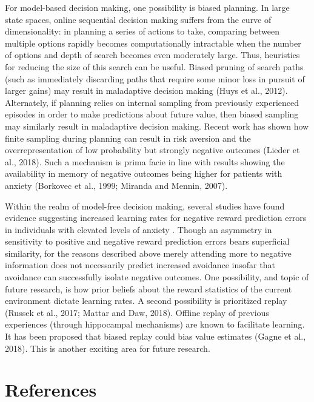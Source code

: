 \documentclass[11pt]{article} %
\begin{document}
For model-based decision making, one possibility is biased planning. In large
state spaces, online sequential decision making suffers from the curve of
dimensionality: in planning a series of actions to take, comparing between
multiple options rapidly becomes computationally intractable when the number of
options and depth of search becomes even moderately large. Thus, heuristics for
reducing the size of this search can be useful. Biased pruning of search paths
(such as immediately discarding paths that require some minor loss in pursuit of
larger gains) may result in maladaptive decision making (Huys et al., 2012).
Alternately, if planning relies on internal sampling from previously experienced
episodes in order to make predictions about future value, then biased sampling
 may similarly result in maladaptive decision making. Recent work has shown how
 finite sampling during planning can result in risk aversion and the overrepresentation
 of low probability but strongly negative outcomes (Lieder et al., 2018). Such a
 mechanism is prima facie in line with results showing the availability in memory
 of negative outcomes being higher for patients with anxiety (Borkovec et al., 1999;
 Miranda and Mennin, 2007).

Within the realm of model-free decision making, several studies have found evidence
suggesting increased learning rates for negative reward prediction errors in
individuals with elevated levels of anxiety \citep{Aylward, Huang2017, Harle2017
garrett2018}. Though an asymmetry in sensitivity to
positive and negative reward prediction errors bears superficial similarity, for
the reasons described above merely attending more to negative information does not
necessarily predict increased avoidance insofar that avoidance can successfully
isolate negative outcomes. One possibility, and topic of future research, is how
prior beliefs about the reward statistics of the current environment dictate
learning rates. A second possibility is prioritized replay (Russek et al., 2017;
Mattar and Daw, 2018). Offline replay of previous experiences (through hippocampal
mechanisms) are known to facilitate learning. It has been proposed that biased
replay could bias value estimates (Gagne et al., 2018). This is another exciting
area for future research.


\section{References}



\end{document}
